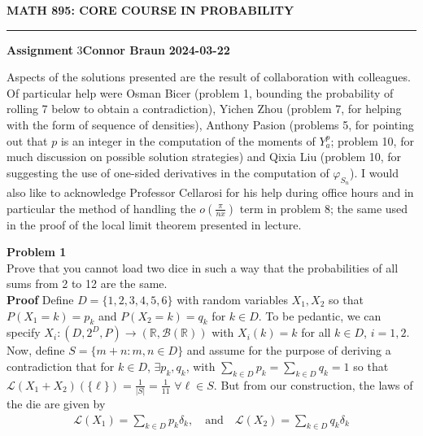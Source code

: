 \documentclass[10pt]{article}
\newcommand{\bp}[1]{\left({#1}\right)}
\newcommand{\mbb}[1]{\mathbb{#1}}
\newcommand{\1}[1]{\mathbbm{1}_{#1}}
\newcommand{\mc}[1]{\mathcal{#1}}
\begin{document}
    \begin{center}
        {\bf\large{MATH 895: CORE COURSE IN PROBABILITY}}
        \smallskip
        \hrule
        \smallskip
        {\bf Assignment} 3\hfill {\bf Connor Braun} \hfill {\bf 2024-03-22}
    \end{center}
    \begin{center}
        \begin{minipage}{\dimexpr\paperwidth-10cm}
            Aspects of the solutions presented are the result of collaboration with colleagues. Of particular help were Osman Bicer (problem 1, bounding the probability of rolling 7 below to obtain a contradiction), Yichen Zhou (problem 7, for helping with the form of sequence of densities), Anthony Pasion (problems 5, for pointing out that $p$ is an integer in the computation of the moments of $Y_a^p$; problem 10, for
            much discussion on possible solution strategies) and Qixia Liu (problem 10, for suggesting the use of one-sided derivatives in the computation of $\varphi_{S_n}$). I would also like to acknowledge Professor Cellarosi for his help during office hours and in particular the method of handling the $o\bp{\frac{\pi}{nx}}$ term in problem 8; the same used in the proof of the local limit theorem presented in lecture.
        \end{minipage}
    \end{center}
    \vspace{5pt}
    {\bf Problem 1}\\[5pt]
    Prove that you cannot load two dice in such a way that the probabilities of all sums from 2 to 12 are the same.\\[5pt]
    {\bf Proof}\hspace{5pt} Define $D=\{1,2,3,4,5,6\}$ with random variables $X_1,X_2$ so that
    $P(X_1=k)=p_k$ and $P(X_2=k)=q_k$ for $k\in D$. To be pedantic, we can specify $X_i:(D,2^D,P)\rightarrow (\mbb{R},\mc{B}(\mbb{R}))$ with $X_i(k)=k$ for all $k\in D$, $i=1,2$.\\[5pt]
    Now, define $S=\{m+n:m,n\in D\}$ and assume for the purpose of deriving a contradiction that for $k\in D$, $\exists p_k,q_k$, with $\sum_{k\in D}p_k=\sum_{k\in D}q_k=1$ so that $\mathcal{L}(X_1+X_2)(\{\ell\})=\tfrac{1}{|S|}=\tfrac{1}{11}$ $\forall \ell\in S$.
    But from our construction, the laws of the die are given by
    \begin{align*}
        \mc{L}(X_1)=\sum_{k\in D}p_k\delta_k,\quad\text{and}\quad\mc{L}(X_2)=\sum_{k\in D}q_k\delta_k
    \end{align*}
\end{document}
